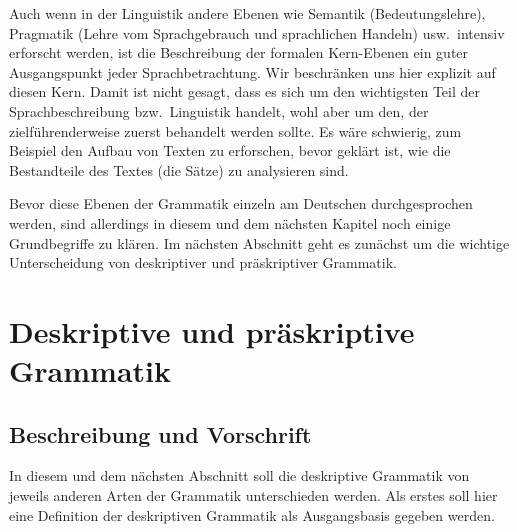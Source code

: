 Auch wenn in der Linguistik andere Ebenen wie Semantik (Bedeutungslehre), Pragmatik (Lehre vom Sprachgebrauch und sprachlichen Handeln) usw.\ intensiv erforscht werden, ist die Beschreibung der formalen Kern-Ebenen ein guter Ausgangspunkt jeder Sprachbetrachtung.
Wir beschränken uns hier explizit auf diesen Kern.
Damit ist nicht gesagt, dass es sich um den wichtigsten Teil der Sprachbeschreibung bzw.\ Linguistik handelt, wohl aber um den, der zielführenderweise zuerst behandelt werden sollte.
Es wäre schwierig, zum Beispiel den Aufbau von Texten zu erforschen, bevor geklärt ist, wie die Bestandteile des Textes (die Sätze) zu analysieren sind.

Bevor diese Ebenen der Grammatik einzeln am Deutschen durchgesprochen werden, sind allerdings in diesem und dem nächsten Kapitel noch einige Grundbegriffe zu klären.
Im nächsten Abschnitt geht es zunächst um die wichtige Unterscheidung von deskriptiver und präskriptiver Grammatik.

\section{Deskriptive und präskriptive Grammatik}

\label{sec:deskriptivnormativ}

\subsection{Beschreibung und Vorschrift}

In diesem und dem nächsten Abschnitt soll die deskriptive Grammatik von jeweils anderen Arten der Grammatik unterschieden werden.
Als erstes soll hier eine Definition der deskriptiven Grammatik als Ausgangsbasis gegeben werden.


